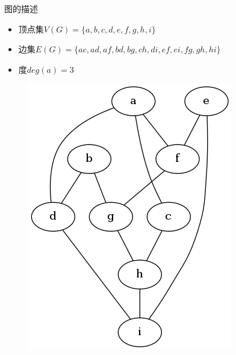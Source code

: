 \documentclass[UTF8]{ctexbeamer}
\begin{document}
\begin{frame}{图的描述}
  \begin{itemize}
  \item 顶点集$V(G) = \{a, b, c, d, e, f, g, h, i\}$
  \item 边集$E(G) = \{ac, ad, af, bd, bg, ch, di, ef, ei, fg, gh, hi\}$
  \item 度$deg(a) = 3$
  \end{itemize}

  \begin{figure}
    \centering
    \includegraphics[height=.4\textheight{}]{graph.png}
  \end{figure}
  
\end{frame}
\end{document}
